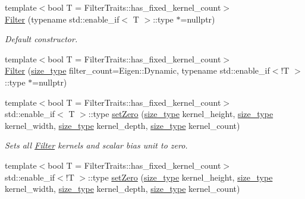 \begin{DoxyCompactItemize}
\item 
{\footnotesize template$<$bool T = Filter\-Traits\-::has\-\_\-fixed\-\_\-kernel\-\_\-count$>$ }\\\hyperlink{structffnn_1_1layer_1_1convolution_1_1_filter_af80132b0fc2f143b51c5a74b67bd8087}{Filter} (typename std\-::enable\-\_\-if$<$ T $>$\-::type $\ast$=nullptr)
\begin{DoxyCompactList}\small\item\em Default constructor. \end{DoxyCompactList}\item 
{\footnotesize template$<$bool T = Filter\-Traits\-::has\-\_\-fixed\-\_\-kernel\-\_\-count$>$ }\\\hyperlink{structffnn_1_1layer_1_1convolution_1_1_filter_aa30daabca2ad08e70bd2934d7b6a3ae1}{Filter} (\hyperlink{namespaceffnn_a63b90a2fd70eb76684eac482a51633e5}{size\-\_\-type} filter\-\_\-count=Eigen\-::\-Dynamic, typename std\-::enable\-\_\-if$<$!T $>$\-::type $\ast$=nullptr)
\item 
{\footnotesize template$<$bool T = Filter\-Traits\-::has\-\_\-fixed\-\_\-kernel\-\_\-count$>$ }\\std\-::enable\-\_\-if$<$ T $>$\-::type \hyperlink{structffnn_1_1layer_1_1convolution_1_1_filter_a09cfe9a12ffe20d705ef14081273473f}{set\-Zero} (\hyperlink{namespaceffnn_a63b90a2fd70eb76684eac482a51633e5}{size\-\_\-type} kernel\-\_\-height, \hyperlink{namespaceffnn_a63b90a2fd70eb76684eac482a51633e5}{size\-\_\-type} kernel\-\_\-width, \hyperlink{namespaceffnn_a63b90a2fd70eb76684eac482a51633e5}{size\-\_\-type} kernel\-\_\-depth, \hyperlink{namespaceffnn_a63b90a2fd70eb76684eac482a51633e5}{size\-\_\-type} kernel\-\_\-count)
\begin{DoxyCompactList}\small\item\em Sets all \hyperlink{structffnn_1_1layer_1_1convolution_1_1_filter}{Filter} kernels and scalar bias unit to zero. \end{DoxyCompactList}\item 
{\footnotesize template$<$bool T = Filter\-Traits\-::has\-\_\-fixed\-\_\-kernel\-\_\-count$>$ }\\std\-::enable\-\_\-if$<$!T $>$\-::type \hyperlink{structffnn_1_1layer_1_1convolution_1_1_filter_a60d6321f7622476fd60e20cbb47f4214}{set\-Zero} (\hyperlink{namespaceffnn_a63b90a2fd70eb76684eac482a51633e5}{size\-\_\-type} kernel\-\_\-height, \hyperlink{namespaceffnn_a63b90a2fd70eb76684eac482a51633e5}{size\-\_\-type} kernel\-\_\-width, \hyperlink{namespaceffnn_a63b90a2fd70eb76684eac482a51633e5}{size\-\_\-type} kernel\-\_\-depth, \hyperlink{namespaceffnn_a63b90a2fd70eb76684eac482a51633e5}{size\-\_\-type} kernel\-\_\-count)

\end{DoxyCompactItemize}
